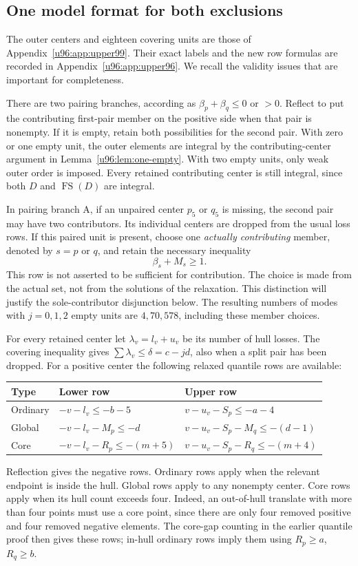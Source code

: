 \documentclass[11pt,a4paper]{article}
\theoremstyle{remark}
\newcommand{\FS}{\operatorname{FS}}
\begin{document}
\subsection{One model format for both exclusions}
The outer centers and eighteen covering units are those of
Appendix~\ref{u96:app:upper99}. Their exact labels and the new row formulas
are recorded in Appendix~\ref{u96:app:upper96}. We recall the validity issues
that are important for completeness.

There are two pairing branches, according as $\beta_p+\beta_q\leq0$
or $>0$. Reflect to put the contributing first-pair member on the positive
side when that pair is nonempty. If it is empty, retain both possibilities
for the second pair. With zero or one empty unit, the outer elements are
integral by the contributing-center argument in Lemma~\ref{u96:lem:one-empty}.
With two empty units, only weak outer order is imposed. Every retained
contributing center is still integral, since both $D$ and $\FS(D)$ are
integral.

In pairing branch A, if an unpaired center $p_5$ or $q_5$ is missing,
the second pair may have two contributors. Its individual centers are
dropped from the usual loss rows. If this paired unit is present, choose
one \emph{actually contributing} member, denoted by $s=p$ or $q$, and
retain the necessary inequality
\begin{equation}
 \beta_s+M_s\geq1.\label{u96:eq:chosen-member96}
\end{equation}
This row is not asserted to be sufficient for contribution. The choice
is made from the actual set, not from the solutions of the relaxation.
This distinction will justify the sole-contributor disjunction below.
The resulting numbers of modes with $j=0,1,2$ empty units are
$4,70,578$, including these member choices.

For every retained center let $\lambda_v=l_v+u_v$ be its number of hull
losses. The covering inequality gives
$\sum\lambda_v\leq\delta=c-jd$, also when a split pair has been dropped.
For a positive center the following relaxed quantile rows are available:
\begin{center}\small
\begin{tabular}{lll}
\toprule
Type&Lower row&Upper row\\\midrule
Ordinary&$-v-l_v\leq-b-5$&$v-u_v-S_p\leq-a-4$\\
Global&$-v-l_v-M_p\leq-d$&$v-u_v-S_p-M_q\leq-(d-1)$\\
Core&$-v-l_v-R_p\leq-(m+5)$&$v-u_v-S_p-R_q\leq-(m+4)$\\\bottomrule
\end{tabular}
\end{center}
Reflection gives the negative rows. Ordinary rows apply when the relevant
endpoint is inside the hull. Global rows apply to any nonempty center.
Core rows apply when its hull count exceeds four. Indeed, an out-of-hull
translate with more than four points must use a core point, since there
are only four removed positive and four removed negative elements.
The core-gap counting in the earlier quantile proof then gives these
rows; in-hull ordinary rows imply them using $R_p\geq a$, $R_q\geq b$.
\end{document}
